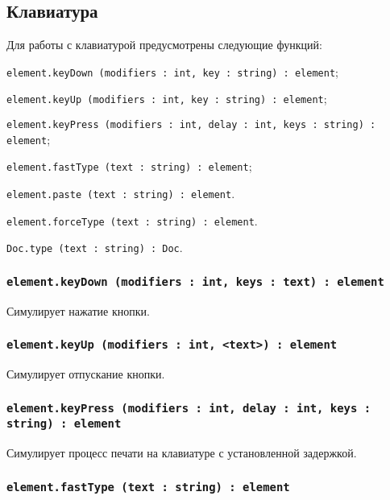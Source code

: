 \subsection{Клавиатура}

Для работы с клавиатурой предусмотрены следующие функций:
\begin{icItems}
	\item \texttt{element.keyDown (modifiers : int, key : string) : element};
	\item \texttt{element.keyUp (modifiers : int, key : string) : element};
	\item \texttt{element.keyPress (modifiers : int, delay : int, keys : string) : element};
	\item \texttt{element.fastType (text : string) : element};
	\item \texttt{element.paste (text : string) : element}.
	\item \texttt{element.forceType (text : string) : element}.
	\item \texttt{Doc.type (text : string) : Doc}.
\end{icItems}

\subsubsection{\texttt{element.keyDown (modifiers : int, keys : text) : element}}

Симулирует нажатие кнопки.

\subsubsection{\texttt{element.keyUp (modifiers : int, <text>) : element}}

Симулирует отпускание кнопки.

\subsubsection{\texttt{element.keyPress (modifiers : int, delay : int, keys : string) : element}}

Симулирует процесс печати на клавиатуре с установленной задержкой.

\subsubsection{\texttt{element.fastType (text : string) : element}}

